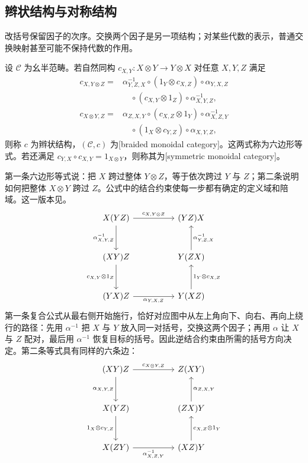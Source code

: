 \subsection{辫状结构与对称结构}
\label{b4:subsec:monoidal-braiding}

改括号保留因子的次序。交换两个因子是另一项结构；对某些代数的表示，普通交换映射甚至可能不保持代数的作用。

\begin{definition}\label{b4:def:braided-symmetric-category}
	设 \(\mathcal C\) 为幺半范畴。若自然同构 \(c_{X,Y}:X\otimes Y\to Y\otimes X\) 对任意 \(X,Y,Z\) 满足
	\begin{equation}\label{b4:eq:monoidal-hexagons}
		\begin{aligned}
			c_{X,Y\otimes Z} ={}&\alpha_{Y,Z,X}^{-1}\circ(1_Y\otimes c_{X,Z})\circ\alpha_{Y,X,Z}
			\\
			&\quad\circ(c_{X,Y}\otimes1_Z)\circ\alpha_{X,Y,Z}^{-1},\\
			c_{X\otimes Y,Z} ={}&\alpha_{Z,X,Y}\circ(c_{X,Z}\otimes1_Y)\circ\alpha_{X,Z,Y}^{-1}
			\\
			&\quad\circ(1_X\otimes c_{Y,Z})\circ\alpha_{X,Y,Z},
		\end{aligned}
	\end{equation}
	则称 \(c\) 为辫状结构，\((\mathcal C,c)\) 为[braided monoidal category]。这两式称为六边形等式。若还满足 \(c_{Y,X}\circ c_{X,Y}=1_{X\otimes Y}\)，则称其为[symmetric monoidal category]。
\end{definition}

第一条六边形等式说：把 \(X\) 跨过整体 \(Y\otimes Z\)，等于依次跨过 \(Y\) 与 \(Z\)；第二条说明如何把整体 \(X\otimes Y\) 跨过 \(Z\)。公式中的结合约束使每一步都有确定的定义域和陪域。这一版本见\cite[Definition 8.1.1, p. 195]{EtingofEtAl2015TensorCategories}。
\[
	\begin{tikzcd}[column sep=5em,row sep=3em]
		X(YZ)\arrow[r,"c_{X,Y\otimes Z}"] \arrow[d,"\alpha_{X,Y,Z}^{-1}"']&(YZ)X\\
		(XY)Z\arrow[d,"c_{X,Y}\otimes1_Z"']& Y(ZX)\arrow[u,"\alpha_{Y,Z,X}^{-1}"']\\
		(YX)Z\arrow[r,"\alpha_{Y,X,Z}"']& Y(XZ)\arrow[u,"1_Y\otimes c_{X,Z}"']
	\end{tikzcd}
\]
第一条复合公式从最右侧开始施行，恰好对应图中从左上角向下、向右、再向上绕行的路径：先用 \(\alpha^{-1}\) 把 \(X\) 与 \(Y\) 放入同一对括号，交换这两个因子；再用 \(\alpha\) 让 \(X\) 与 \(Z\) 配对，最后用 \(\alpha^{-1}\) 恢复目标的括号。因此逆结合约束由所需的括号方向决定。第二条等式具有同样的六条边：
\[
	\begin{tikzcd}[column sep=5em,row sep=3em]
		(XY)Z\arrow[r,"c_{X\otimes Y,Z}"] \arrow[d,"\alpha_{X,Y,Z}"']&Z(XY)\\
		X(YZ)\arrow[d,"1_X\otimes c_{Y,Z}"']& (ZX)Y\arrow[u,"\alpha_{Z,X,Y}"']\\
		X(ZY)\arrow[r,"\alpha_{X,Z,Y}^{-1}"']& (XZ)Y\arrow[u,"c_{X,Z}\otimes1_Y"']
	\end{tikzcd}
\]

